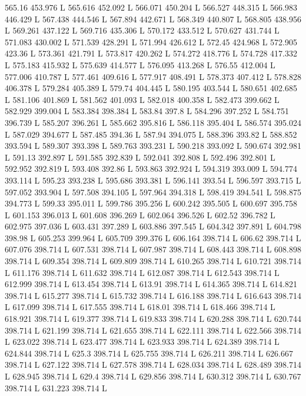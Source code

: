 565.16 453.976 L
565.616 452.092 L
566.071 450.204 L
566.527 448.315 L
566.983 446.429 L
567.438 444.546 L
567.894 442.671 L
568.349 440.807 L
568.805 438.956 L
569.261 437.122 L
569.716 435.306 L
570.172 433.512 L
570.627 431.744 L
571.083 430.002 L
571.539 428.291 L
571.994 426.612 L
572.45 424.968 L
572.905 423.36 L
573.361 421.791 L
573.817 420.262 L
574.272 418.776 L
574.728 417.332 L
575.183 415.932 L
575.639 414.577 L
576.095 413.268 L
576.55 412.004 L
577.006 410.787 L
577.461 409.616 L
577.917 408.491 L
578.373 407.412 L
578.828 406.378 L
579.284 405.389 L
579.74 404.445 L
580.195 403.544 L
580.651 402.685 L
581.106 401.869 L
581.562 401.093 L
582.018 400.358 L
582.473 399.662 L
582.929 399.004 L
583.384 398.384 L
583.84 397.8 L
584.296 397.252 L
584.751 396.739 L
585.207 396.261 L
585.662 395.816 L
586.118 395.404 L
586.574 395.024 L
587.029 394.677 L
587.485 394.36 L
587.94 394.075 L
588.396 393.82 L
588.852 393.594 L
589.307 393.398 L
589.763 393.231 L
590.218 393.092 L
590.674 392.981 L
591.13 392.897 L
591.585 392.839 L
592.041 392.808 L
592.496 392.801 L
592.952 392.819 L
593.408 392.86 L
593.863 392.924 L
594.319 393.009 L
594.774 393.114 L
595.23 393.238 L
595.686 393.381 L
596.141 393.54 L
596.597 393.715 L
597.052 393.904 L
597.508 394.105 L
597.964 394.318 L
598.419 394.541 L
598.875 394.773 L
599.33 395.011 L
599.786 395.256 L
600.242 395.505 L
600.697 395.758 L
601.153 396.013 L
601.608 396.269 L
602.064 396.526 L
602.52 396.782 L
602.975 397.036 L
603.431 397.289 L
603.886 397.545 L
604.342 397.891 L
604.798 398.98 L
605.253 399.964 L
605.709 399.376 L
606.164 398.714 L
606.62 398.714 L
607.076 398.714 L
607.531 398.714 L
607.987 398.714 L
608.443 398.714 L
608.898 398.714 L
609.354 398.714 L
609.809 398.714 L
610.265 398.714 L
610.721 398.714 L
611.176 398.714 L
611.632 398.714 L
612.087 398.714 L
612.543 398.714 L
612.999 398.714 L
613.454 398.714 L
613.91 398.714 L
614.365 398.714 L
614.821 398.714 L
615.277 398.714 L
615.732 398.714 L
616.188 398.714 L
616.643 398.714 L
617.099 398.714 L
617.555 398.714 L
618.01 398.714 L
618.466 398.714 L
618.921 398.714 L
619.377 398.714 L
619.833 398.714 L
620.288 398.714 L
620.744 398.714 L
621.199 398.714 L
621.655 398.714 L
622.111 398.714 L
622.566 398.714 L
623.022 398.714 L
623.477 398.714 L
623.933 398.714 L
624.389 398.714 L
624.844 398.714 L
625.3 398.714 L
625.755 398.714 L
626.211 398.714 L
626.667 398.714 L
627.122 398.714 L
627.578 398.714 L
628.034 398.714 L
628.489 398.714 L
628.945 398.714 L
629.4 398.714 L
629.856 398.714 L
630.312 398.714 L
630.767 398.714 L
631.223 398.714 L
